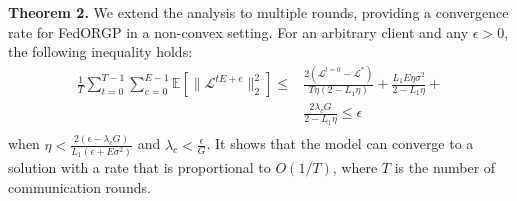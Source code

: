\textbf{Theorem 2.} We extend the analysis to multiple rounds, providing a convergence rate for FedORGP in a non-convex setting. For an arbitrary client and any $\epsilon> 0$, the following inequality holds:
\begin{equation}
    \begin{aligned}
        \frac1T\sum_{t=0}^{T-1}\sum_{e=0}^{E-1}\mathbb{E}\left[\|\mathcal{L}^{tE+e}\|_2^2\right]\leqslant &\frac{2\left(\mathcal{L}^{t=0}-\mathcal{L}^*\right)}{T\eta\left(2-L_1\eta\right)}+\frac{L_1E\eta\sigma^2}{2-L_1\eta}+\\
        &\frac{2\lambda_c G}{2-L_1\eta}\leqslant \epsilon\\
    \end{aligned}
    \label{eq:theroem 2}
\end{equation}
when $\eta<\frac{2(\epsilon-\lambda_c G)}{L_1\left(\epsilon+E\sigma^2\right)}$ and $\lambda_c < \frac{\epsilon}{G}$.
 It shows that the model can converge to a solution with a rate that is proportional to $O(1/T)$, where $T$ is the number of communication rounds.

